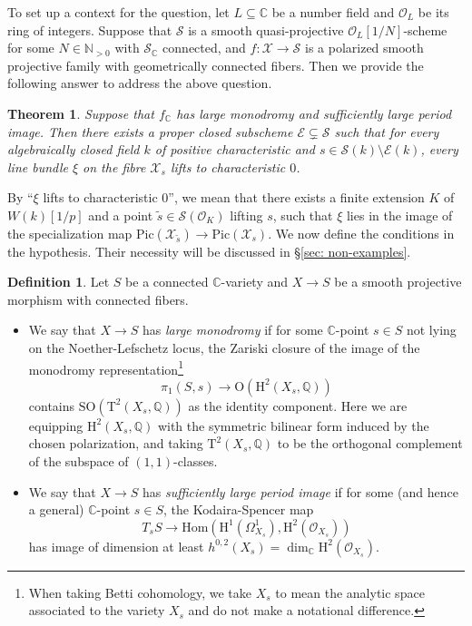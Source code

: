 \documentclass[letter, 11pt]{article}
\theoremstyle{plain}
\newtheorem{theorem}[subsubsection]{Theorem}
\theoremstyle{definition}
\newtheorem{definition}[subsubsection]{Definition}
\newcommand{\IC}{\mathbb{C}}
\newcommand{\IN}{\mathbb{N}}
\newcommand{\IQ}{\mathbb{Q}}
\newcommand{\Hom}{\mathrm{Hom}}
\newcommand{\<}{\langle}
\renewcommand{\>}{\rangle}
\def\wt{\widetilde}
\newcommand{\sX}{\mathcal{X}}
\newcommand{\sS}{\mathcal{S}}
\newcommand{\sE}{\mathcal{E}}
\newcommand{\sO}{\mathcal{O}}
\newcommand{\Pic}{\mathrm{Pic}}
\renewcommand{\H}{\mathrm{H}}
\newcommand{\mpr}{}
\begin{document}
To set up a context for the question, let $L \subseteq \IC$ be a number field and $\sO_L$ be its ring of integers. Suppose that $\sS$ is a smooth quasi-projective $\sO_L[1/N]$-scheme for some $N \in \IN_{> 0}$ with $\sS_\IC$ connected, and $f : \sX \to \sS$ is a polarized smooth projective family with geometrically connected fibers. Then we provide the following answer to address the above question. 

\begin{theorem}
\label{mainthm1}
Suppose that $f_\IC$ has large monodromy and sufficiently large period image. Then there exists a proper closed subscheme $\sE \subsetneq \sS$ such that for every algebraically closed field $k$ of positive characteristic and $s \in \sS(k) \setminus \sE(k)$, every line bundle $\xi$ on the fibre $\sX_{s}$ lifts to characteristic $0$. 
\end{theorem}

By ``$\xi$ lifts to characteristic $0$'', we mean that there exists a finite extension $K$ of $W(k)[1/p]$ and a point $\wt{s} \in \sS(\sO_K)$ lifting $s$, such that $\xi$ lies in the image of the specialization map $\Pic(\sX_{\wt{s}}) \to \Pic(\sX_s)$. We now define the conditions in the hypothesis. Their necessity will be discussed in \S\ref{sec: non-examples}. 

\begin{definition}
\label{def: large monodromy}
Let $S$ be a connected $\IC$-variety and $X \to S$ be a smooth projective morphism with connected fibers. 
\begin{itemize}
    \item We say that $X \to S$ has \emph{large monodromy} if for some $\IC$-point $s \in S$ not lying on the Noether-Lefschetz locus, the Zariski closure of the image of the monodromy representation\footnote{\mpr{When taking Betti cohomology, we take $X_s$ to mean the analytic space associated to the variety $X_s$ and do not make a notational difference.}}
    \[ \pi_{1}(S, s) \to \mathrm{O}(\mathrm{H}^{2}(X_s, \IQ)) \]
    contains $\mathrm{SO}(\mathrm{T}^{2}(X_{s}, \IQ))$ as the identity component. Here we are equipping $\H^2(X_s, \IQ)$ with the symmetric bilinear form induced by the chosen polarization, and taking $\mathrm{T}^{2}(X_{s}, \IQ)$ to be the orthogonal complement of the subspace of $(1, 1)$-classes. 
    \item We say that $X \to S$ has \emph{sufficiently large period image} if for some (and hence a general) $\IC$-point $s \in S$, the Kodaira-Spencer map 
    \begin{equation}
        \label{eqn: Kodaira-Spencer}
        T_{s} S \to \Hom(\H^1(\Omega^1_{X_s}), \H^2(\sO_{X_s}))
    \end{equation}
    has image of dimension at least $h^{0, 2}(X_s) = \dim_{\IC} \H^{2}(\sO_{X_s})$.
\end{itemize}
\end{definition}
\end{document}
